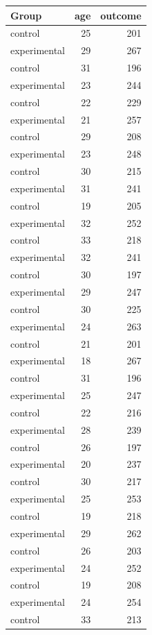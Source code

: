 \documentclass[]{svmono}
\theoremstyle{definition}
\theoremstyle{definition}
\theoremstyle{definition}
\theoremstyle{remark}
\begin{document}
\begin{tabular}{l|r|r}
\hline
Group & age & outcome\\
\hline
control & 25 & 201\\
\hline
experimental & 29 & 267\\
\hline
control & 31 & 196\\
\hline
experimental & 23 & 244\\
\hline
control & 22 & 229\\
\hline
experimental & 21 & 257\\
\hline
control & 29 & 208\\
\hline
experimental & 23 & 248\\
\hline
control & 30 & 215\\
\hline
experimental & 31 & 241\\
\hline
control & 19 & 205\\
\hline
experimental & 32 & 252\\
\hline
control & 33 & 218\\
\hline
experimental & 32 & 241\\
\hline
control & 30 & 197\\
\hline
experimental & 29 & 247\\
\hline
control & 30 & 225\\
\hline
experimental & 24 & 263\\
\hline
control & 21 & 201\\
\hline
experimental & 18 & 267\\
\hline
control & 31 & 196\\
\hline
experimental & 25 & 247\\
\hline
control & 22 & 216\\
\hline
experimental & 28 & 239\\
\hline
control & 26 & 197\\
\hline
experimental & 20 & 237\\
\hline
control & 30 & 217\\
\hline
experimental & 25 & 253\\
\hline
control & 19 & 218\\
\hline
experimental & 29 & 262\\
\hline
control & 26 & 203\\
\hline
experimental & 24 & 252\\
\hline
control & 19 & 208\\
\hline
experimental & 24 & 254\\
\hline
control & 33 & 213\\
\hline

\end{tabular}
\end{document}
